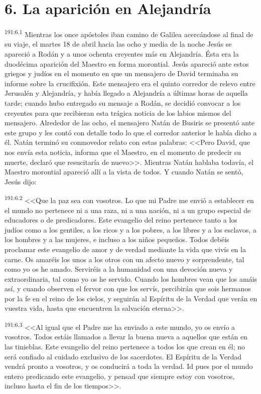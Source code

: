 \section*{6. La aparición en Alejandría}
\par 
\textsuperscript{191:6.1} Mientras los once apóstoles iban camino de Galilea acercándose al final de su viaje, el martes 18 de abril hacia las ocho y media de la noche Jesús se apareció a Rodán y a unos ochenta creyentes más en Alejandría. Ésta era la duodécima aparición del Maestro en forma morontial. Jesús apareció ante estos griegos y judíos en el momento en que un mensajero de David terminaba su informe sobre la crucifixión. Este mensajero era el quinto corredor de relevo entre Jerusalén y Alejandría, y había llegado a Alejandría a últimas horas de aquella tarde; cuando hubo entregado su mensaje a Rodán, se decidió convocar a los creyentes para que recibieran esta trágica noticia de los labios mismos del mensajero. Alrededor de las ocho, el mensajero Natán de Busiris se presentó ante este grupo y les contó con detalle todo lo que el corredor anterior le había dicho a él. Natán terminó su conmovedor relato con estas palabras: <<Pero David, que nos envía esta noticia, informa que el Maestro, en el momento de predecir su muerte, declaró que resucitaría de nuevo>>. Mientras Natán hablaba todavía, el Maestro morontial apareció allí a la vista de todos. Y cuando Natán se sentó, Jesús dijo:

\par 
\textsuperscript{191:6.2} <<Que la paz sea con vosotros. Lo que mi Padre me envió a establecer en el mundo no pertenece ni a una raza, ni a una nación, ni a un grupo especial de educadores o de predicadores. Este evangelio del reino pertenece tanto a los judíos como a los gentiles, a los ricos y a los pobres, a los libres y a los esclavos, a los hombres y a las mujeres, e incluso a los niños pequeños. Todos debéis proclamar este evangelio de amor y de verdad mediante la vida que vivís en la carne. Os amaréis los unos a los otros con un afecto nuevo y sorprendente, tal como yo os he amado. Serviréis a la humanidad con una devoción nueva y extraordinaria, tal como yo os he servido. Cuando los hombres vean que los amáis así, y cuando observen el fervor con que los servís, percibirán que sois hermanos por la fe en el reino de los cielos, y seguirán al Espíritu de la Verdad que verán en vuestra vida, hasta que encuentren la salvación eterna>>.

\par 
\textsuperscript{191:6.3} <<Al igual que el Padre me ha enviado a este mundo, yo os envío a vosotros. Todos estáis llamados a llevar la buena nueva a aquellos que están en las tinieblas. Este evangelio del reino pertenece a todos los que crean en él; no será confiado al cuidado exclusivo de los sacerdotes. El Espíritu de la Verdad vendrá pronto a vosotros, y os conducirá a toda la verdad. Id pues por el mundo entero predicando este evangelio, y pensad que siempre estoy con vosotros, incluso hasta el fin de los tiempos>>.

